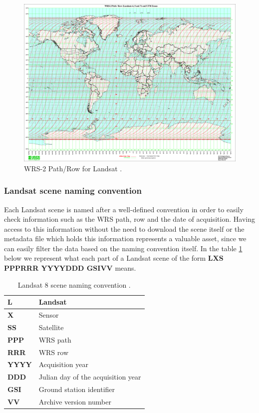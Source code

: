 \documentclass[12pt, a4paper]{report}
\begin{document}
	\begin{figure}[h]
		\centering
		\includegraphics[scale=0.2]{../images/wrs2.png}
		\caption{WRS-2 Path/Row for Landsat \cite{wrs}.}
		\label{fig:wrs2}
	\end{figure}
	
	\subsubsection{Landsat scene naming convention}
	\label{seq:landsat_naming}
	
	\par Each Landsat scene is named after a well-defined convention in order to easily check information such as the WRS path, row and the date of acquisition. Having access to this information without the need to download the scene itself or the metadata file which holds this information represents a valuable asset, since we can easily filter the data based on the naming convention itself. In the table \ref{table:landsat_table} below we represent what each part of a Landsat scene of the form \textbf{LXS PPPRRR YYYYDDD GSIVV} means.
	\begin{table} [h]
		\center
		\begin{tabularx}{480pt}{|X|X|}
			\toprule
			\textbf{L} & Landsat \\ [0.2ex]
			\midrule
			\textbf{X} & Sensor \\ [0.2ex]
			\midrule
			\textbf{SS} & Satellite \\ [0.2ex]
			\midrule
			\textbf{PPP} & WRS path \\ [0.2ex]
			\midrule
			\textbf{RRR} & WRS row \\ [0.2ex]
			\midrule
			\textbf{YYYY} & Acquisition year \\ [0.2ex]
			\midrule
			\textbf{DDD} & Julian day of the acquisition year \\ [0.2ex]
			\midrule
			\textbf{GSI} & Ground station identifier \\ [0.2ex]
			\midrule
			\textbf{VV} & Archive version number \\ [0.2ex]
			\midrule
			\midrule
			\bottomrule
		\end{tabularx}
		\caption{Landsat 8 scene naming convention \cite{sn}.}
		\label{table:landsat_table}
	\end{table}
	
\end{document}
